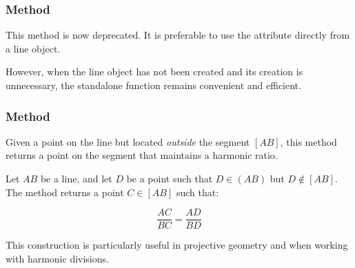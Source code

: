 
\subsubsection{Method } %
\label{ssub:method_line_midpoint}

This method is now deprecated. It is preferable to use the attribute  directly from a line object.

\medskip
\noindent
However, when the line object has not been created and its creation is unnecessary, the standalone function  remains convenient and efficient.


\begin{center}
\end{center}




\subsubsection{Method } %
\label{ssub:method_line_harmonic_int}

Given a point on the line but located \emph{outside} the segment $[AB]$, this method returns a point on the segment that maintains a harmonic ratio.

\medskip
\noindent
Let $AB$ be a line, and let $D$ be a point such that $D \in (AB)$ but $D \not\in [AB]$. The method returns a point $C \in [AB]$ such that:

\[
\frac{AC}{BC} = \frac{AD}{BD}
\]

\noindent
This construction is particularly useful in projective geometry and when working with harmonic divisions.

\vspace{2em}
\begin{tkzexample}
\begin{center}
\end{center}

\end{tkzexample}

